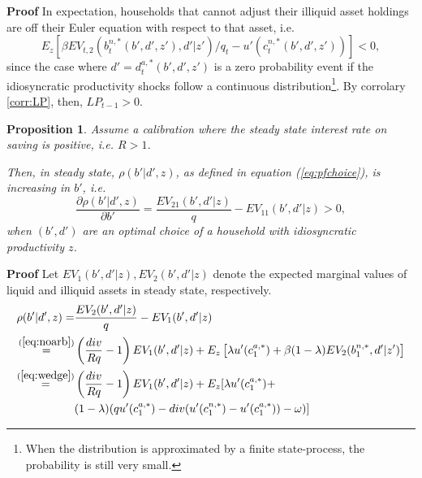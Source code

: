 \documentclass[11pt]{article} %
\newtheorem{prop}{Proposition}
\begin{document}
\textbf{Proof} In expectation, households that cannot adjust their illiquid asset holdings are off their Euler equation with respect to that asset, i.e.
\begin{equation}
E_z \left[ \beta EV_{t,2}(b_t^{n,*}(b',d',z'),d'|z')/q_t - u'(c^{n,*}_t(b',d',z')) \right] <0,
\end{equation}
since the case where $d' = d_t^{a,*}(b',d',z')$ is a zero probability event if the idiosyncratic productivity shocks follow a continuous distribution\footnote{When the distribution is approximated by a finite state-process, the probability is still very small.}. By corrolary \ref{corr:LP}, then, $LP_{t-1}>0$.


\begin{prop}\label{prop:rho}
Assume a calibration where the steady state interest rate on saving is positive, i.e. $R>1$.

Then, in steady state, $\rho(b'|d',z)$, as defined in equation (\ref{eq:pfchoice}), is increasing in $b'$, i.e.
\begin{equation}
\frac{\partial \rho(b'|d',z)}{\partial b'} = \frac{EV_{21}(b',d'|z)}{q} - EV_{11}(b',d'|z) > 0,
\end{equation}
when $(b',d')$ are an optimal choice of a household with idiosyncratic productivity $z$.
\end{prop}
\textbf{Proof} Let $EV_1(b',d'|z),EV_2(b',d'|z)$ denote the expected marginal values of liquid and illiquid assets in steady state, respectively.
\begin{align}
\rho(b'|d',z) =& \frac{EV_2(b',d'|z)}{q}-EV_1(b',d'|z) \\ \overset{ (\ref{eq:noarb})}{=}& \left( \frac{div}{Rq} - 1 \right) EV_1(b',d'|z) + E_z\left[ \lambda u'(c_1^{a,*}) + \beta (1-\lambda) EV_2(b_1^{n,*},d'|z')\right]\\
\overset{(\ref{eq:wedge})}{=} &  \left( \frac{div}{Rq} - 1 \right) EV_1(b',d'|z) + E_z [ \lambda u'(c_1^{a,*}) +\nonumber \\ & (1-\lambda) (q u'(c_1^{a,*}) - div( u'(c_1^{n,*})-u'(c_1^{a,*}))-\omega) ]\label{eq:rhostep1}
\end{align}
\end{document}
